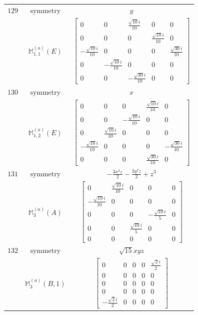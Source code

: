 \documentclass[fleqn,8pt,landscape]{jsarticle}
\begin{document}
\begin{longtable}{ccc}
$ 129 $ & $ \text{symmetry} $ & $ y $ \\
$  $ & $ \mathbb{M}_{1,1}^{(a)}(E) $ & $ \begin{bmatrix} 0 & 0 & \frac{\sqrt{10} i}{10} & 0 & 0 \\ 0 & 0 & 0 & \frac{\sqrt{10} i}{10} & 0 \\ - \frac{\sqrt{10} i}{10} & 0 & 0 & 0 & \frac{\sqrt{30} i}{10} \\ 0 & - \frac{\sqrt{10} i}{10} & 0 & 0 & 0 \\ 0 & 0 & - \frac{\sqrt{30} i}{10} & 0 & 0 \end{bmatrix} $ \\ \hline
$ 130 $ & $ \text{symmetry} $ & $ x $ \\
$  $ & $ \mathbb{M}_{1,2}^{(a)}(E) $ & $ \begin{bmatrix} 0 & 0 & 0 & \frac{\sqrt{10} i}{10} & 0 \\ 0 & 0 & - \frac{\sqrt{10} i}{10} & 0 & 0 \\ 0 & \frac{\sqrt{10} i}{10} & 0 & 0 & 0 \\ - \frac{\sqrt{10} i}{10} & 0 & 0 & 0 & - \frac{\sqrt{30} i}{10} \\ 0 & 0 & 0 & \frac{\sqrt{30} i}{10} & 0 \end{bmatrix} $ \\ \hline
$ 131 $ & $ \text{symmetry} $ & $ - \frac{3 x^{2} z}{2} - \frac{3 y^{2} z}{2} + z^{3} $ \\
$  $ & $ \mathbb{M}_{3}^{(a)}(A) $ & $ \begin{bmatrix} 0 & \frac{\sqrt{10} i}{10} & 0 & 0 & 0 \\ - \frac{\sqrt{10} i}{10} & 0 & 0 & 0 & 0 \\ 0 & 0 & 0 & - \frac{\sqrt{10} i}{5} & 0 \\ 0 & 0 & \frac{\sqrt{10} i}{5} & 0 & 0 \\ 0 & 0 & 0 & 0 & 0 \end{bmatrix} $ \\ \hline
$ 132 $ & $ \text{symmetry} $ & $ \sqrt{15} x y z $ \\
$  $ & $ \mathbb{M}_{3}^{(a)}(B,1) $ & $ \begin{bmatrix} 0 & 0 & 0 & 0 & \frac{\sqrt{2} i}{2} \\ 0 & 0 & 0 & 0 & 0 \\ 0 & 0 & 0 & 0 & 0 \\ 0 & 0 & 0 & 0 & 0 \\ - \frac{\sqrt{2} i}{2} & 0 & 0 & 0 & 0 \end{bmatrix} $ \\ \hline

\end{longtable}
\end{document}
